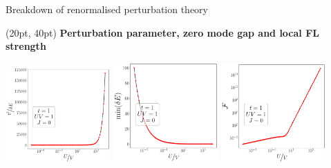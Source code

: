 \documentclass[aspectratio=169]{beamer}
\newcommand{\head}[1]{
\begin{textblock*}{\textwidth}(20pt, 40pt)
\textbf{\Large {#1}}
\end{textblock*}
}
\begin{document}
\begin{frame}[noframenumbering]{Breakdown of renormalised perturbation theory}

\head{Perturbation parameter, zero mode gap and local FL strength}

{
\centering
\includegraphics[width=0.3\textwidth]{figures/par-t=1.000,V=1_over_U,J=0,N=4,U=0.010,100.000,100.pdf}
\hspace*{\fill}
\includegraphics[width=0.3\textwidth]{figures/gap-t=1.000,V=1_over_U,J=0,N=4,U=0.010,100.000,100.pdf}
\hspace*{\fill}
\includegraphics[width=0.3\textwidth]{figures/lfl-t=1.000,V=1_over_U,J=0,N=4,U=0.010,100.000,100.pdf}
}

\end{frame}
\end{document}
